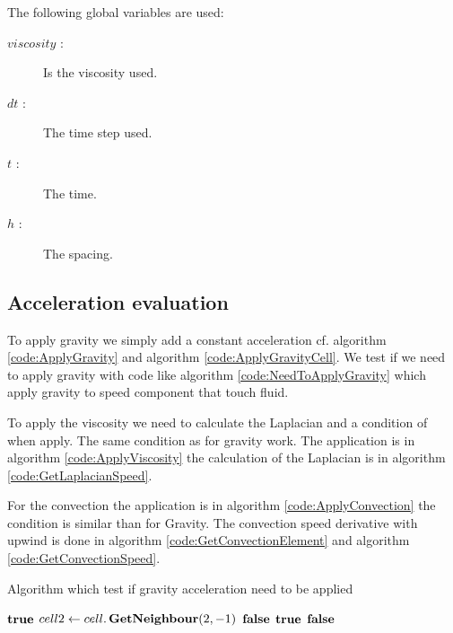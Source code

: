 The following global variables are used:
\begin{description}
 \item[$viscosity$ :] Is the viscosity used.
 \item[$dt$ :] The time step used.
 \item[$t$ :] The time.
 \item[$h$ :] The spacing.
\end{description}


\subsection{Acceleration evaluation}

To apply gravity we simply add a constant acceleration cf. algorithm \ref{code:ApplyGravity} and algorithm \ref{code:ApplyGravityCell}.
We test if we need to apply gravity with code like algorithm \ref{code:NeedToApplyGravity} which apply gravity to speed component
that touch fluid.

To apply the viscosity we need to calculate the Laplacian and a condition of when apply.
The same condition as for gravity work.
The application is in algorithm \ref{code:ApplyViscosity} the calculation of the Laplacian is in algorithm \ref{code:GetLaplacianSpeed}.

For the convection the application is in algorithm \ref{code:ApplyConvection} the condition is similar than for Gravity.
The convection speed derivative with upwind is done in algorithm \ref{code:GetConvectionElement} and algorithm \ref{code:GetConvectionSpeed}.

\begin{algorithm}
\caption{Algorithm which test if gravity acceleration need to be applied}
\label{code:NeedToApplyGravity}
\begin{algorithmic}[1]
			\State \Return $\mathop{\textbf{true}}$ 
		\EndIf
		\State $cell2 \gets cell.\mathop{\textbf{GetNeighbour}}(2,-1)$ 
			\State \Return $\mathop{\textbf{false}}$ 
		\EndIf
			\State \Return $\mathop{\textbf{true}}$ 
		\EndIf
		\State \Return $\mathop{\textbf{false}}$
	\EndFunction
	\end{algorithmic}
\end{algorithm}


